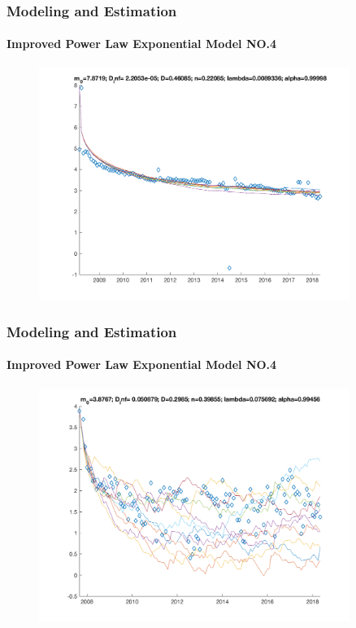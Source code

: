 \documentclass[11pt]{beamer}
\begin{document}
\begin{frame}
	\frametitle{Modeling and Estimation}
	\framesubtitle{Improved Power Law Exponential Model NO.4}
	\justifying
	\begin{figure}
		\begin{center}
			\includegraphics[width=0.9\textwidth  ]{AAplot_374} 
		\end{center}
	\end{figure}				
\end{frame}	


\begin{frame}
	\frametitle{Modeling and Estimation}
	\framesubtitle{Improved Power Law Exponential Model NO.4}
	\justifying
	\begin{figure}
		\begin{center}
			\includegraphics[width=0.9\textwidth  ]{AAplot_1153} 
		\end{center}
	\end{figure}				
\end{frame}	
\end{document}
